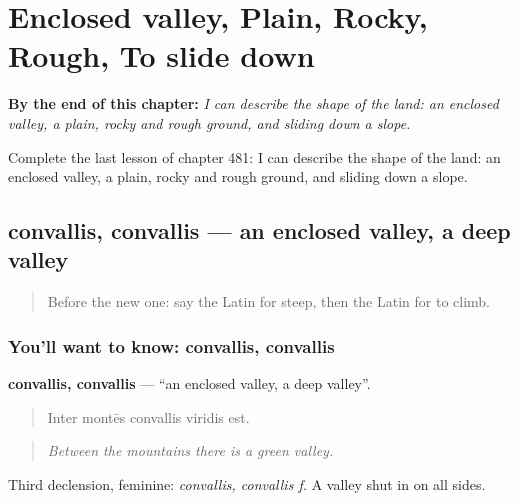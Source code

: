 
\chapter{Enclosed valley, Plain, Rocky, Rough, To slide down}
\label{ch:la-enclosed-valley-plain-rocky-rough-to-slide-down}

\begin{chapteropening}
\textbf{By the end of this chapter:} \emph{I can describe the shape of the land: an enclosed valley, a plain, rocky and rough ground, and sliding down a slope.}

Complete the last lesson of chapter 481: I can describe the shape of the land: an enclosed valley, a plain, rocky and rough ground, and sliding down a slope.
\end{chapteropening}

\section[convallis, convallis]{convallis, convallis — an enclosed valley, a deep valley}

\label{lesson:LA-C481-convallis}



\begin{quote}
Before the new one: say the Latin for steep, then the Latin for to climb.
\end{quote}

\subsection*{You'll want to know: convallis, convallis}
\textbf{convallis, convallis} — \textquotedblleft{}an enclosed valley, a deep valley\textquotedblright{}.

\begin{quote}
Inter montēs convallis viridis est.
\end{quote}

\begin{quote}
\emph{Between the mountains there is a green valley.}
\end{quote}

Third declension, feminine: \emph{convallis, convallis f.} A valley shut in on all sides.

